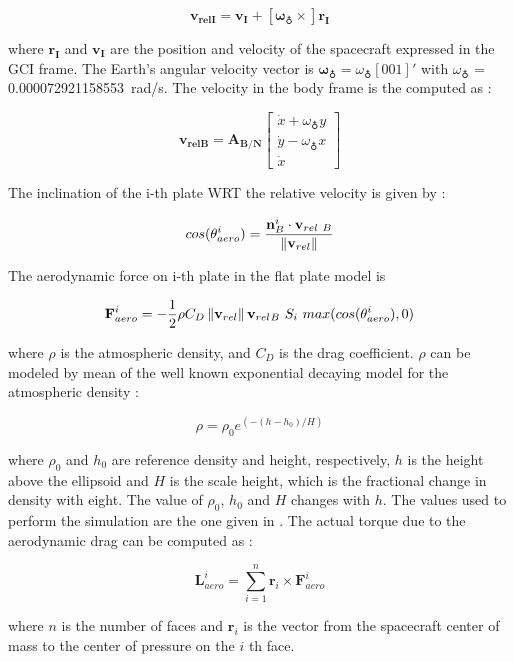 \begin{equation}
 \mathbf{v_{relI}} =  \mathbf{v_I} + [\mathbf{\omega_{\earth} \times}] \mathbf{r_I}
\end{equation}

where $\mathbf{r_I}$ and $\mathbf{v_I}$ are the position and velocity of the spacecraft expressed in the GCI frame. 
The Earth's angular velocity vector is $\mathbf{\omega_{\earth}} = \omega_{\earth}[0 0 1]'$ with $\omega_{\earth}$ = \SI{0.000072921158553}{\radian/\second}.
The velocity in the body frame is the computed as : 

\begin{equation}
 \mathbf{v_{relB}} = \mathbf{A_{B/N}}   \begin{bmatrix} \dot{x} + \omega_{\earth} y \\ \dot{y} - \omega_{\earth} x \\ \dot{x} \end{bmatrix}
\end{equation}

The inclination of the i-th plate WRT the relative velocity is given by : 

\begin{equation}
 cos(\theta_{aero}^{i}) = \frac{\mathbf{n}_{B}^{i} \cdot \mathbf{v}_{rel\ B}}{\norm{\mathbf{v}_{rel}}}
\end{equation}

The aerodynamic force on i-th plate in the flat plate model is

\begin{equation}
 \mathbf{F}_{aero}^{i} = - \frac{1}{2} \rho C_{D} \norm{\mathbf{v}_{rel}} \mathbf{v}_{rel_{} B}\ S_{i}\ max(cos(\theta_{aero}^{i}),0)
\end{equation}

where $\rho$ is the atmospheric density, and $C_D$ is the drag coefficient.  
$\rho$ can be modeled by mean of the well known exponential decaying model for the atmospheric density :

\begin{equation}
 \rho = \rho_{0} e^{(-(h-h_{0})/H)}
\end{equation}

where $\rho_{0}$ and $h_{0}$ are reference density and height, respectively, $h$ is the height above the ellipsoid and $H$ is the scale height, which is the fractional change in density with eight.
The value of $\rho_{0}$, $h_{0}$  and $H$ changes with $h$. 
The values used to perform the simulation are the one given in \cite{Markley2014}.
The actual torque due to the aerodynamic drag can be computed as : 

\begin{equation}
 \mathbf{L}_{aero}^{i} = \sum\limits_{i=1}^n  \mathbf{r}_{i} \times \mathbf{F}_{aero}^{i}
\end{equation}

where $n$ is the number of faces and $\mathbf{r}_{i}$ is the vector from the spacecraft center of mass to the center of pressure on the $i$ th face.
